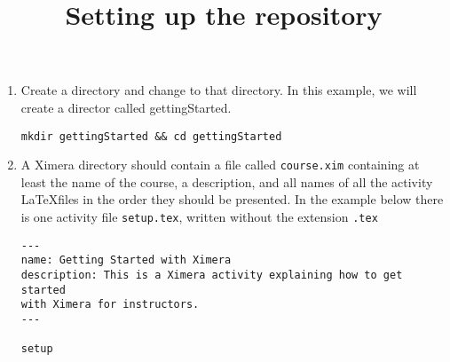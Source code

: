 \documentclass{ximera}
\begin{document}
\title{Setting up the repository}
\begin{enumerate}
\item Create a directory and change to that directory.
In this example, we will create a director called gettingStarted.
\begin{center}
\begin{verbatim}
mkdir gettingStarted && cd gettingStarted
\end{verbatim}
\end{center}
\item A Ximera directory should contain
a file called \verb!course.xim! containing
at least the name of the course, a description,
and all names of all the activity \LaTeX files in the order
they should be presented. In the example below
there is one activity file \verb!setup.tex!,
written without the extension
\verb!.tex!
\begin{verbatim}
---
name: Getting Started with Ximera
description: This is a Ximera activity explaining how to get started
with Ximera for instructors.
---

setup
\end{verbatim}

\end{enumerate}
\end{document}
